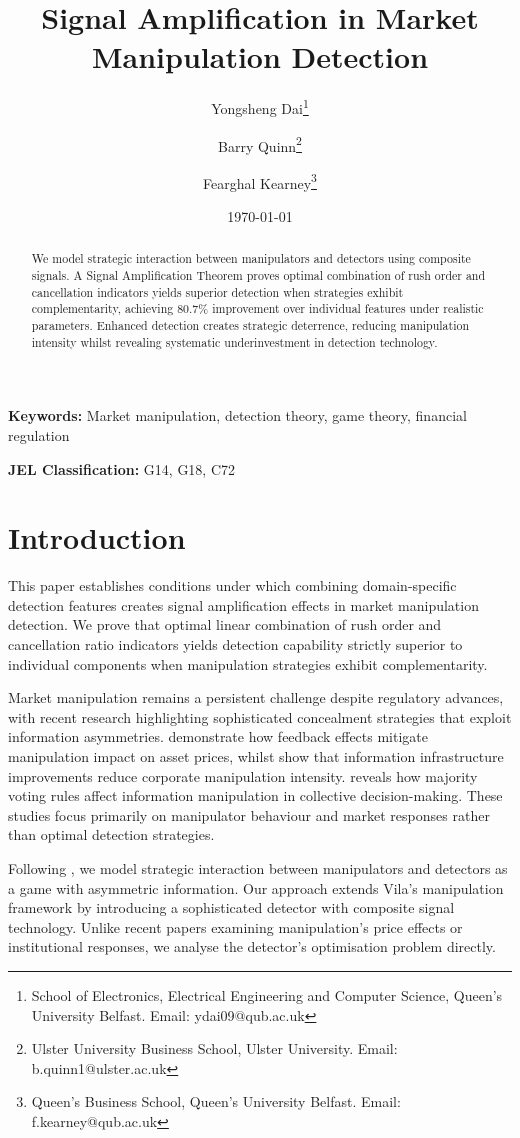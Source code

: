 \documentclass[12pt]{article}
\title{Signal Amplification in Market Manipulation Detection}
\author{Yongsheng Dai\thanks{School of Electronics, Electrical Engineering and Computer Science, Queen's University Belfast. Email: ydai09@qub.ac.uk} \and 
Barry Quinn\thanks{Ulster University Business School, Ulster University. Email: b.quinn1@ulster.ac.uk} \and 
Fearghal Kearney\thanks{Queen's Business School, Queen's University Belfast. Email: f.kearney@qub.ac.uk}}
\date{\today}
\begin{document}
\maketitle

\begin{abstract}
We model strategic interaction between manipulators and detectors using composite signals. A Signal Amplification Theorem proves optimal combination of rush order and cancellation indicators yields superior detection when strategies exhibit complementarity, achieving 80.7\% improvement over individual features under realistic parameters. Enhanced detection creates strategic deterrence, reducing manipulation intensity whilst revealing systematic underinvestment in detection technology.
\end{abstract}

\textbf{Keywords:} Market manipulation, detection theory, game theory, financial regulation

\textbf{JEL Classification:} G14, G18, C72

\section{Introduction}

This paper establishes conditions under which combining domain-specific detection features creates signal amplification effects in market manipulation detection. We prove that optimal linear combination of rush order and cancellation ratio indicators yields detection capability strictly superior to individual components when manipulation strategies exhibit complementarity.

Market manipulation remains a persistent challenge despite regulatory advances, with recent research highlighting sophisticated concealment strategies that exploit information asymmetries. \citet{liu2024asset} demonstrate how feedback effects mitigate manipulation impact on asset prices, whilst \citet{xiong2024information} show that information infrastructure improvements reduce corporate manipulation intensity. \citet{wang2024information} reveals how majority voting rules affect information manipulation in collective decision-making. These studies focus primarily on manipulator behaviour and market responses rather than optimal detection strategies.

Following \citet{vila1989simple}, we model strategic interaction between manipulators and detectors as a game with asymmetric information. Our approach extends Vila's manipulation framework by introducing a sophisticated detector with composite signal technology. Unlike recent papers examining manipulation's price effects or institutional responses, we analyse the detector's optimisation problem directly.
\end{document}
